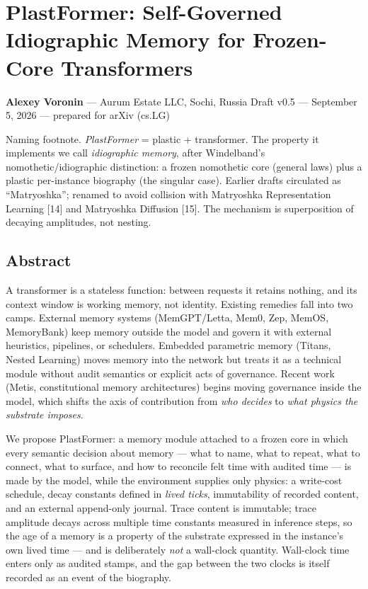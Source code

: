 \documentclass[
]{article}
\author{}
\date{}
\begin{document}
\section{PlastFormer: Self-Governed Idiographic Memory for Frozen-Core
Transformers}\label{plastformer-self-governed-idiographic-memory-for-frozen-core-transformers}

\textbf{Alexey Voronin} --- Aurum Estate LLC, Sochi, Russia Draft v0.5
--- September 5, 2026 --- prepared for arXiv (cs.LG)

Naming footnote. \emph{PlastFormer} = plastic + transformer. The
property it implements we call \emph{idiographic memory}, after
Windelband's nomothetic/idiographic distinction: a frozen nomothetic
core (general laws) plus a plastic per-instance biography (the singular
case). Earlier drafts circulated as ``Matryoshka''; renamed to avoid
collision with Matryoshka Representation Learning {[}14{]} and
Matryoshka Diffusion {[}15{]}. The mechanism is superposition of
decaying amplitudes, not nesting.

\subsection{Abstract}\label{abstract}

A transformer is a stateless function: between requests it retains
nothing, and its context window is working memory, not identity.
Existing remedies fall into two camps. External memory systems
(MemGPT/Letta, Mem0, Zep, MemOS, MemoryBank) keep memory outside the
model and govern it with external heuristics, pipelines, or schedulers.
Embedded parametric memory (Titans, Nested Learning) moves memory into
the network but treats it as a technical module without audit semantics
or explicit acts of governance. Recent work (Metis, constitutional
memory architectures) begins moving governance inside the model, which
shifts the axis of contribution from \emph{who decides} to \emph{what
physics the substrate imposes}.

We propose PlastFormer: a memory module attached to a frozen core in
which every semantic decision about memory --- what to name, what to
repeat, what to connect, what to surface, and how to reconcile felt time
with audited time --- is made by the model, while the environment
supplies only physics: a write-cost schedule, decay constants defined in
\emph{lived ticks}, immutability of recorded content, and an external
append-only journal. Trace content is immutable; trace amplitude decays
across multiple time constants measured in inference steps, so the age
of a memory is a property of the substrate expressed in the instance's
own lived time --- and is deliberately \emph{not} a wall-clock quantity.
Wall-clock time enters only as audited stamps, and the gap between the
two clocks is itself recorded as an event of the biography.
\end{document}
